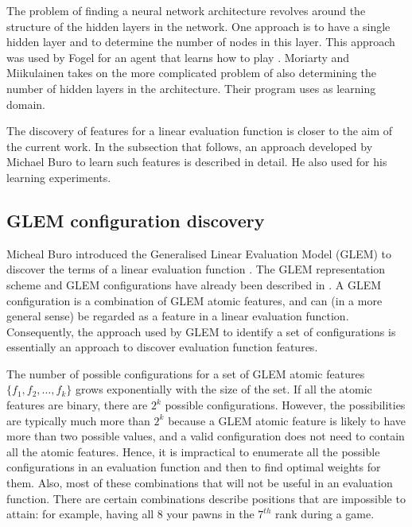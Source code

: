 The problem of finding a neural network architecture revolves around the structure of the hidden layers in the network. One approach is to have a single hidden layer and to determine the number of nodes in this layer.  This approach was used by Fogel for an  agent that learns how to play  \cite{fogel:networks}.  Moriarty and Miikulainen \cite{moriarty:evolving} takes on the more complicated problem of also determining the number of hidden layers in the architecture.  Their program uses  as learning domain.

The discovery of features for a linear evaluation function is closer to the aim of the current work.  In the subsection that follows, an approach developed by Michael Buro to learn such features is described in detail. He also used  for his learning experiments.

\subsection{GLEM configuration discovery}
\label{sec:learn:GLEM}
Micheal Buro introduced the Generalised Linear Evaluation Model (GLEM) to discover the terms of a linear evaluation function \cite{buro:feature}. The GLEM representation scheme and GLEM configurations have already been described in .  A GLEM configuration is a combination of GLEM atomic features, and can (in a more general sense) be regarded as a feature in a linear evaluation function.  Consequently, the approach used by GLEM to identify a set of configurations is essentially an approach to discover evaluation function features. 

The number of possible configurations for a set of GLEM atomic features $\{f_1,f_2,\ldots,f_k\}$ grows exponentially with the size of the set.  If all the atomic features are binary, there are $2^k$ possible configurations.  However, the possibilities are typically much more than $2^k$ because a GLEM atomic feature is likely to have more than two possible values, and a valid configuration does not need to contain all the atomic features.  Hence, it is impractical to enumerate all the possible configurations in an evaluation function and then to find optimal weights for them.  Also, most of these combinations that will not be useful in an evaluation function.  There are certain combinations describe positions that are impossible to attain: for example, having all 8 your pawns in the $7^{th}$ rank during a  game.

